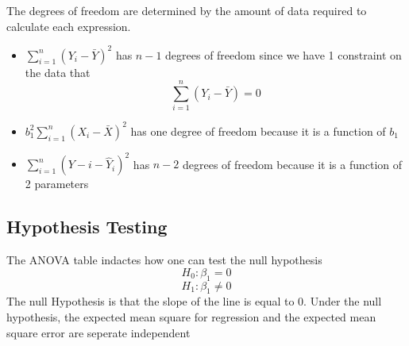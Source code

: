 The degrees of freedom are determined by the amount of data required to calculate each expression. 
\begin{itemize}
    \item $\sum\limits_{i=1}^n (Y_i-\bar{Y})^2$ has $n-1$ degrees of freedom since we have 1 constraint on the data that 
    \[\sum_{i=1}^n (Y_i - \bar{Y}) = 0\]
    \item $b_1^2\sum\limits_{i=1}^n (X_i - \bar{X})^2$ has one degree of freedom because it is a function of $b_1$
    \item $\sum\limits_{i=1}^n(Y-i - \hat{Y}_i)^2$ has $n-2$ degrees of freedom because it is a function of 2 parameters
\end{itemize}

\subsection{Hypothesis Testing}

The ANOVA table indactes how one can test the null hypothesis
\[H_0 : \beta_1 = 0\]
\[H_1 : \beta_1 \neq 0\]
The null Hypothesis is that the slope of the line is equal to 0. Under the null hypothesis, the expected mean square for regression and the expected mean square error are seperate independent 